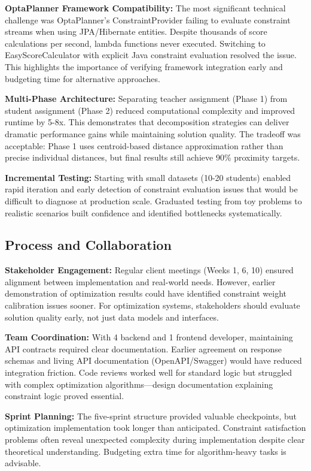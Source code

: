 \documentclass[12pt,a4paper]{report}
\begin{document}
\textbf{OptaPlanner Framework Compatibility:} The most significant technical challenge was OptaPlanner's ConstraintProvider failing to evaluate constraint streams when using JPA/Hibernate entities. Despite thousands of score calculations per second, lambda functions never executed. Switching to EasyScoreCalculator with explicit Java constraint evaluation resolved the issue. This highlights the importance of verifying framework integration early and budgeting time for alternative approaches.

\textbf{Multi-Phase Architecture:} Separating teacher assignment (Phase 1) from student assignment (Phase 2) reduced computational complexity and improved runtime by 5-8x. This demonstrates that decomposition strategies can deliver dramatic performance gains while maintaining solution quality. The tradeoff was acceptable: Phase 1 uses centroid-based distance approximation rather than precise individual distances, but final results still achieve 90\% proximity targets.

\textbf{Incremental Testing:} Starting with small datasets (10-20 students) enabled rapid iteration and early detection of constraint evaluation issues that would be difficult to diagnose at production scale. Graduated testing from toy problems to realistic scenarios built confidence and identified bottlenecks systematically.

\subsection{Process and Collaboration}

\textbf{Stakeholder Engagement:} Regular client meetings (Weeks 1, 6, 10) ensured alignment between implementation and real-world needs. However, earlier demonstration of optimization results could have identified constraint weight calibration issues sooner. For optimization systems, stakeholders should evaluate solution quality early, not just data models and interfaces.

\textbf{Team Coordination:} With 4 backend and 1 frontend developer, maintaining API contracts required clear documentation. Earlier agreement on response schemas and living API documentation (OpenAPI/Swagger) would have reduced integration friction. Code reviews worked well for standard logic but struggled with complex optimization algorithms—design documentation explaining constraint logic proved essential.

\textbf{Sprint Planning:} The five-sprint structure provided valuable checkpoints, but optimization implementation took longer than anticipated. Constraint satisfaction problems often reveal unexpected complexity during implementation despite clear theoretical understanding. Budgeting extra time for algorithm-heavy tasks is advisable.
\end{document}
